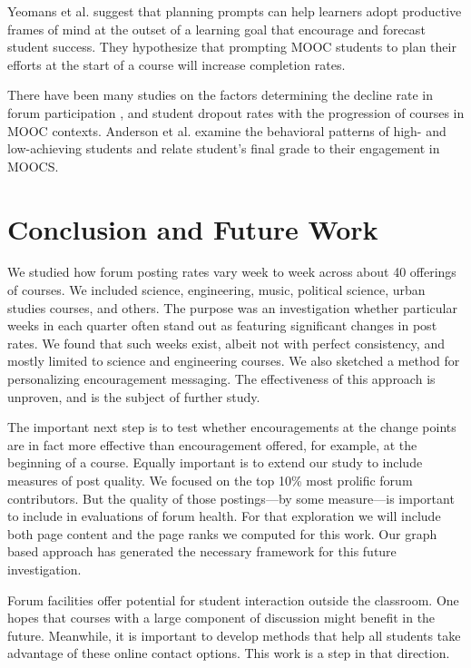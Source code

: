 Yeomans et al. \cite{Yeomans} suggest that planning prompts can help
learners adopt productive frames of mind at the outset of a learning
goal that encourage and forecast student success. They hypothesize
that prompting MOOC students to plan their efforts at the start of a
course will increase completion rates.

There have been many studies on the factors determining the decline
rate in forum participation \cite{DBLP}, and student dropout rates
\cite{Yang_peerinfluence} with the progression of courses in MOOC
contexts. Anderson et al. \cite{DBLP:journals/corr/AndersonHKL14}
examine the behavioral patterns of high- and low-achieving students
and relate student's final grade to their engagement in MOOCS.

\section{Conclusion and Future Work}

We studied how forum posting rates vary week to week across about 40
offerings of courses. We included science, engineering, music,
political science, urban studies courses, and others. The purpose was
an investigation whether particular weeks in each quarter often stand
out as featuring significant changes in post rates. We found that such
weeks exist, albeit not with perfect consistency, and mostly limited
to science and engineering courses. We also sketched a method for
personalizing encouragement messaging. The effectiveness of this
approach is unproven, and is the subject of further study.

The important next step is to test whether encouragements at the
change points are in fact more effective than encouragement offered,
for example, at the beginning of a course. Equally important is to
extend our study to include measures of post quality. We focused on
the top 10\% most prolific forum contributors. But the quality of
those postings---by some measure---is important to include in
evaluations of forum health. For that exploration we will include both
page content and the page ranks we computed for this work.  Our graph
based approach has generated the necessary framework for this future
investigation.

Forum facilities offer potential for student interaction outside the
classroom. One hopes that courses with a large component of discussion
might benefit in the future. Meanwhile, it is important to develop
methods that help all students take advantage of these online contact
options. This work is a step in that direction.

